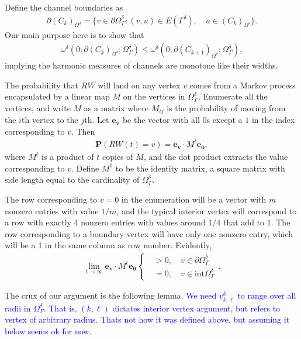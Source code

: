 \documentclass[]{amsart}
\numberwithin{equation}{section}
\begin{document}
Define the channel boundaries as 
\begin{align}
\partial (C_k)_{\Omega^{\delta}} = \{ v \in \partial \varOmega_{\varGamma}^{\delta} : (v,u) \in E(\varGamma^{\delta}), \quad u \in (C_k)_{\Omega^{\delta}} \}.
\end{align}
Our main purpose here is to show that 
\begin{align} \label{channel_monotone}
\omega^{\delta}(0 ; \partial (C_k)_{\Omega^{\delta}}; \varOmega^{\delta}_{\varGamma}) \le \omega^{\delta}(0 ; \partial (C_{k+1})_{\Omega^{\delta}}; \varOmega^{\delta}_{\varGamma}),
\end{align}
implying the harmonic measures of channels are monotone like their widths.  

The probability that $RW$ will land on any vertex $v$ comes from a Markov process encapsulated by a linear map $M$ on the vertices in $\varOmega^{\delta}_{\varGamma}$.  Enumerate all the vertices, and write $M$ as a matrix where $M_{ij}$ is the probability of moving from the $i$th vertex to the $j$th. Let $\mathbf{e_v}$ be the vector with all $0$s except a $1$ in the index corresponding to $v$.  Then
\begin{align}
\mathbf{P}(RW(t) = v) = \mathbf{e_v} \cdot M^t \mathbf{e_0},
\end{align}
where $M^t$ is a product of $t$ copies of $M$, and the dot product extracts the value corresponding to $v$.  Define $M^0$ to be the identity matrix, a square matrix with side length equal to the cardinality of $\varOmega^{\delta}_{\varGamma}$.

 The row corresponding to $v=0$ in the enumeration will be a vector with $m$ nonzero entries with value $1/m$, and the typical interior vertex will correspond to a row with exactly 4 nonzero entries with values around $1/4$ that add to $1$.  The row corresponding to a boundary vertex will have only one nonzero entry, which will be a 1 in the same column as row number.  Evidently, 
 \begin{align}
 \lim_{t \to \infty} \mathbf{e_v} \cdot M^t \mathbf{e_0} 
 \begin{cases}
  &> 0, \quad v \in \partial \varOmega_{\varGamma}^{\delta}\\
  & = 0, \quad v \in \text{int} \varOmega_{\varGamma}^{\delta}
 \end{cases}.
\end{align}

The crux of our argument is the following lemma.  \textcolor{blue}{We need $v^{\delta}_{k,\ell}$ to range over all radii in $\varOmega^{\delta}_{\varGamma}$.  That is, $(k,\ell)$ dictates interior vertex argument, but refers to vertex of arbitrary radius.  Thats not how it was defined above, but assuming it below seems ok for now.}
\end{document}
